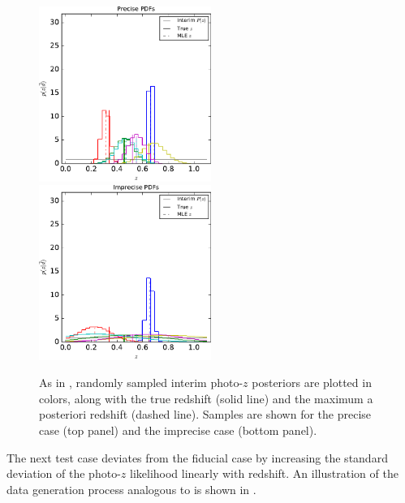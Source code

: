 \begin{figure}
	\includegraphics[width=0.5\textwidth]{figures/chippr/sig1_samplepzs.pdf}\\
	\includegraphics[width=0.5\textwidth]{figures/chippr/sig4_samplepzs.pdf}
	\caption{As in , randomly sampled interim photo-$z$ posteriors are plotted in colors, along with the true redshift (solid line) and the maximum a posteriori redshift (dashed line).  
		Samples are shown for the precise case (top panel) and the imprecise case (bottom panel).}
\end{figure}

The next test case deviates from the fiducial case by increasing the standard deviation of the photo-$z$ likelihood linearly with redshift. 
An illustration of the data generation process analogous to  is shown in .

